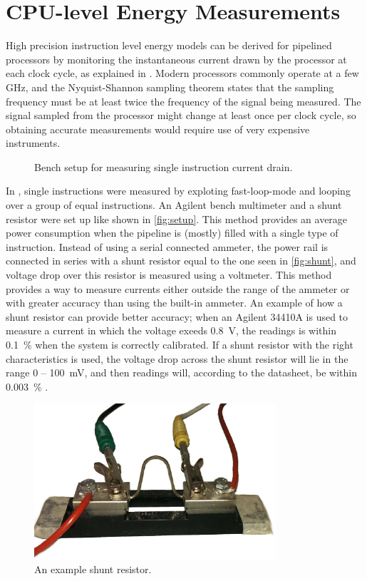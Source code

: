 \section{CPU-level Energy Measurements}
\label{sec:energymeasure}

High precision instruction level energy models can be derived for pipelined
processors by monitoring the instantaneous current drawn by the processor at
each clock cycle, as explained in \cite{nikolaidis2005instruction}. Modern
processors commonly operate at a few GHz, and the Nyquist-Shannon sampling theorem
\cite{nyquist1928certain} states that the sampling frequency must be at least
twice the frequency of the signal being measured. The signal sampled from the
processor might change at least once per clock cycle, so obtaining accurate
measurements would require use of very expensive instruments.

\begin{figure}[tbh]
    \centering
    
    \caption{Bench setup for measuring single instruction current drain.}
    \label{fig:setup}
\end{figure}

In \cite{rundehvatum2013exploring}, single instructions were measured by
exploting fast-loop-mode and looping over a group of equal instructions. An
Agilent bench multimeter and a shunt resistor were set up like shown in
\autoref{fig:setup}. This method provides an average power consumption when the
pipeline is (mostly) filled with a single type of instruction. Instead of using
a serial connected ammeter, the power rail is connected in series with a shunt
resistor equal to the one seen in \autoref{fig:shunt}, and voltage drop over
this resistor is measured using a voltmeter. This method provides a way to
measure currents either outside the range of the ammeter or with greater
accuracy than using the built-in ammeter. An example of how a shunt resistor can
provide better accuracy; when an Agilent 34410A is used to measure a current in
which the voltage exeeds 0.8~V, the readings is within 0.1~\% when the system is
correctly calibrated. If a shunt resistor with the right characteristics is
used, the voltage drop across the shunt resistor will lie in the range 0 --
100~mV, and then readings will, according to the datasheet, be within 0.003~\%
\cite{agilent34410a}.

\begin{figure}[tbh]
    \centering
    \includegraphics[width=0.8\textwidth]{figs/shunt.jpg}
    \caption{An example shunt resistor.}
    \label{fig:shunt}
\end{figure}

